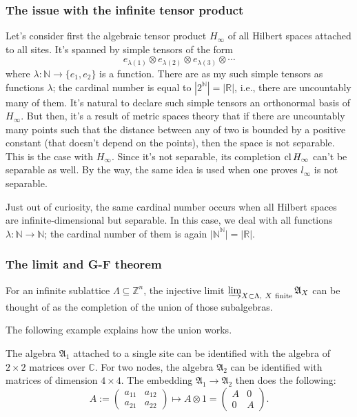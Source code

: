 \subsubsection{The issue with the infinite tensor product}
Let's consider first the algebraic tensor product $H_{\infty}$ of all Hilbert spaces attached to all sites. It's spanned by simple tensors of the form
\[
e_{\lambda(1)} \otimes e_{\lambda(2)} \otimes e_{\lambda(3)} \otimes \cdots 
\]
where $\lambda : \mathbb N \rightarrow \{e_1,e_2\}$ is a function. There are as my such simple tensors as functions $\lambda$; the cardinal number is equal to $|2^{\mathbb N}| = |\mathbb R|$, i.e., there are uncountably many of them. It's natural to declare such simple tensors an orthonormal basis of $H_{\infty}$. But then, it's a result of metric spaces theory that if there are uncountably many points such that the distance between any of two is bounded by a positive constant (that doesn't depend on the points), then the space is not separable. This is the case with $H_{\infty}$. Since it's not separable, its completion $\operatorname{cl} H_{\infty}$ can't be separable as well. By the way, the same idea is used when one proves $l_{\infty}$ is not separable.

Just out of curiosity, the same cardinal number occurs when all Hilbert spaces are infinite-dimensional but separable. In this case, we deal with all functions $\lambda : \mathbb N \rightarrow \mathbb N$; the cardinal number of them is again ${|\mathbb N}^{\mathbb N}| = |\mathbb R|$.

\subsubsection{The limit and G-F theorem}

For an infinite sublattice $\Lambda \subseteq \mathbb Z^n$, the injective limit $\varinjlim_{X \subset \Lambda, \ X \ \text{finite}} \mathfrak A_{X}$ can be thought of as the completion of the union of those subalgebras. 

The following example explains how the union works.
\begin{example}The algebra $\mathfrak A_{1}$ attached to a single site can be identified with the algebra of $2\times 2$ matrices over $\mathbb C$. For two nodes, the algebra $\mathfrak A_{2}$ can be identified with matrices of dimension $4 \times 4$. The embedding $\mathfrak A_{1} \rightarrow \mathfrak A_{2}$ then does the following:
\[
A:=\begin{pmatrix} a_{11} & a_{12}\\ a_{21} & a_{22}\end{pmatrix}
\mapsto A \otimes 1 = \begin{pmatrix} A & 0 \\ 0 & A\end{pmatrix}.
\]
\end{example}


